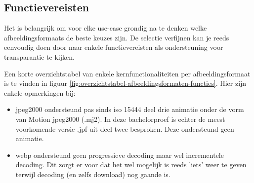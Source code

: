\subsection{Functievereisten}
\label{sec:afbeeldingscompressie-functievereisten}

Het is belangrijk om voor elke \gls{use-case} grondig na te denken welke \glspl{afbeeldingsformaat} de beste keuzes zijn. De selectie verfijnen kan je reeds eenvoudig doen door naar enkele functievereisten als ondersteuning voor transparantie te kijken. 

Een korte overzichtstabel van enkele kernfunctionaliteiten per \gls{afbeeldingsformaat} is te vinden in figuur \ref{fig:overzichtstabel-afbeeldingsformaten-functies}. Hier zijn enkele opmerkingen bij:

\begin{itemize}
	\item \gls{jpeg2000} ondersteund pas sinds \gls{iso} 15444 deel drie animatie onder de vorm van Motion \gls{jpeg2000} (.mj2). In deze bachelorproef is echter de meest voorkomende versie .jpf uit deel twee besproken. Deze ondersteund geen animatie.
	
	\item \Gls{webp} ondersteund geen progressieve \gls{decoding} maar wel incrementele \gls{decoding}. Dit zorgt er voor dat het wel mogelijk is reeds 'iets' weer te geven terwijl \gls{decoding} (en zelfs download) nog gaande is.
\end{itemize}

